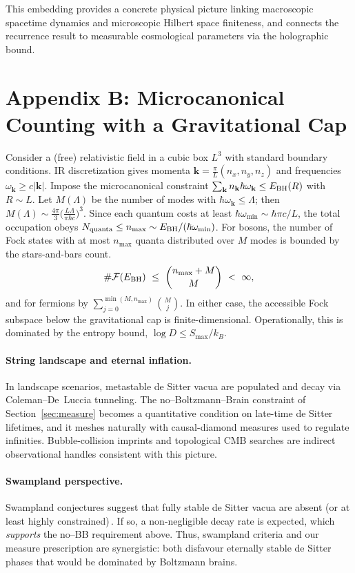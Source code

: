 \documentclass[12pt]{article}
\theoremstyle{remark}
\begin{document}
This embedding provides a concrete physical picture linking macroscopic spacetime dynamics and microscopic Hilbert space finiteness, and connects the recurrence result to measurable cosmological parameters via the holographic bound.

\section*{Appendix B: Microcanonical Counting with a Gravitational Cap}
Consider a (free) relativistic field in a cubic box $L^3$ with standard boundary conditions. IR discretization gives momenta $\mathbf k=\frac{\pi}{L}(n_x,n_y,n_z)$ and frequencies $\omega_{\mathbf k}\ge c|\mathbf k|$. Impose the microcanonical constraint $\sum_{\mathbf k} n_{\mathbf k}\hbar\omega_{\mathbf k}\le E_{\rm BH}(R)$ with $R\sim L$.
Let $M(\Lambda)$ be the number of modes with $\hbar\omega_{\mathbf k}\le \Lambda$; then $M(\Lambda)\sim \frac{4\pi}{3}\big(\frac{L\Lambda}{\pi\hbar c}\big)^3$. Since each quantum costs at least $\hbar\omega_{\min}\sim \hbar\pi c/L$, the total occupation obeys $N_{\text{quanta}}\le n_{\max}\sim E_{\rm BH}/(\hbar\omega_{\min})$.
For bosons, the number of Fock states with at most $n_{\max}$ quanta distributed over $M$ modes is bounded by the stars-and-bars count.
\[
\#\mathcal{F}(E_{\rm BH})\ \le\ \binom{n_{\max}+M}{M}\ <\ \infty,
\]
and for fermions by $\sum_{j=0}^{\min(M,n_{\max})}\binom{M}{j}$. In either case, the accessible Fock subspace below the gravitational cap is finite-dimensional. Operationally, this is dominated by the entropy bound, $\log D\le S_{\max}/k_B$.

\paragraph{String landscape and eternal inflation.}
In landscape scenarios, metastable de Sitter vacua are populated and decay via Coleman–De~Luccia tunneling. The no--Boltzmann--Brain constraint of Section~\ref{sec:measure} becomes a quantitative condition on late-time de Sitter lifetimes, and it meshes naturally with causal-diamond measures used to regulate infinities. Bubble-collision imprints and topological CMB searches are indirect observational handles consistent with this picture.

\paragraph{Swampland perspective.}
Swampland conjectures suggest that fully stable de Sitter vacua are absent (or at least highly constrained)\,\cite{Obied2018,Ooguri2019}. If so, a non-negligible decay rate is expected, which \emph{supports} the no--BB requirement above. Thus, swampland criteria and our measure prescription are synergistic: both disfavour eternally stable de Sitter phases that would be dominated by Boltzmann brains.
\end{document}
